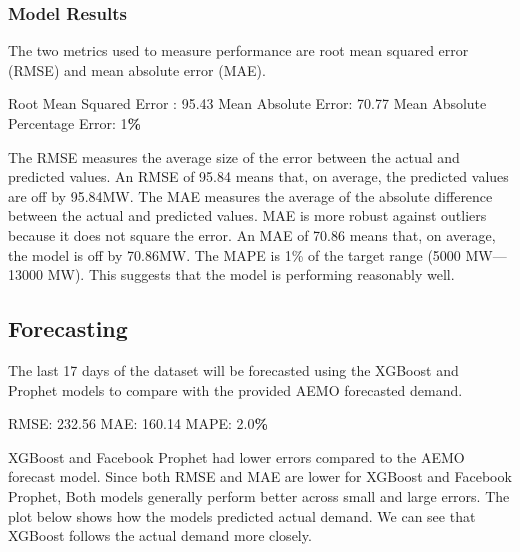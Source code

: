 \documentclass[mstat,12pt]{unswthesis}
\newenvironment{Shaded}{\begin{snugshade}}{\end{snugshade}}
\newcommand{\DecValTok}[1]{\textcolor[rgb]{0.00,0.00,0.81}{#1}}
\newcommand{\FloatTok}[1]{\textcolor[rgb]{0.00,0.00,0.81}{#1}}
\newcommand{\NormalTok}[1]{#1}
\newcommand{\OperatorTok}[1]{\textcolor[rgb]{0.81,0.36,0.00}{\textbf{#1}}}
\begin{document}
\subsubsection{Model Results}\label{model-results}

The two metrics used to measure performance are root mean squared error
(RMSE) and mean absolute error (MAE).

\begin{Shaded}
\begin{Highlighting}[]
\NormalTok{Root Mean Squared Error : }\FloatTok{95.43}
\NormalTok{Mean Absolute Error: }\FloatTok{70.77}
\NormalTok{Mean Absolute Percentage Error: }\DecValTok{1}\OperatorTok{\%}
\end{Highlighting}
\end{Shaded}

The RMSE measures the average size of the error between the actual and
predicted values. An RMSE of 95.84 means that, on average, the predicted
values are off by 95.84MW. The MAE measures the average of the absolute
difference between the actual and predicted values. MAE is more robust
against outliers because it does not square the error. An MAE of 70.86
means that, on average, the model is off by 70.86MW. The MAPE is 1\% of
the target range (5000 MW---13000 MW). This suggests that the model is
performing reasonably well.

\subsection{Forecasting}\label{forecasting}

The last 17 days of the dataset will be forecasted using the XGBoost and
Prophet models to compare with the provided AEMO forecasted demand.

\begin{Shaded}
\begin{Highlighting}[]
\NormalTok{RMSE: }\FloatTok{232.56}
\NormalTok{MAE: }\FloatTok{160.14}
\NormalTok{MAPE: }\FloatTok{2.0}\OperatorTok{\%}
\end{Highlighting}
\end{Shaded}

XGBoost and Facebook Prophet had lower errors compared to the AEMO
forecast model. Since both RMSE and MAE are lower for XGBoost and
Facebook Prophet, Both models generally perform better across small and
large errors. The plot below shows how the models predicted actual
demand. We can see that XGBoost follows the actual demand more closely.
\end{document}
